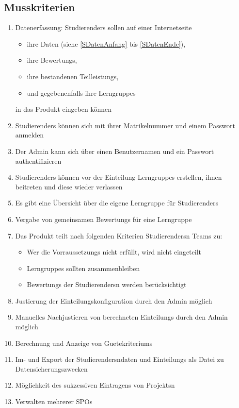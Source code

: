\documentclass[parskip=full]{scrartcl}
\newcommand{\swtLabel}[1]{\textbf{/#1\arabic*0/}}
\begin{document}
\subsection{Musskriterien}
 \begin{enumerate}[label=\swtLabel{M}]
   \item Datenerfassung: \glspl{Studierender} sollen auf einer Internetseite  
   \begin{itemize}
     \item ihre Daten (siehe \ref{SDatenAnfang} bis \ref{SDatenEnde}),     
     \item ihre \glspl{Bewertung}, 
     \item ihre bestandenen \glspl{Teilleistung},
     \item und gegebenenfalls ihre \glspl{Lerngruppe}
   \end{itemize}
   in das Produkt eingeben können
   \item \glspl{Studierender} können sich mit ihrer \gls{Matrikelnummer} und einem Passwort anmelden
   \item Der \gls{Admin} kann sich über einen \gls{Benutzername}n und ein Passwort authentifizieren
   \item \glspl{Studierender} können vor der \gls{Einteilung} \glspl{Lerngruppe} erstellen, ihnen beitreten und diese wieder verlassen
    \item Es gibt eine Übersicht über die eigene \gls{Lerngruppe} für
    \glspl{Studierender}
    \item Vergabe von gemeinsamen  \glspl{Bewertung} für eine \gls{Lerngruppe}
   \item Das Produkt teilt nach folgenden Kriterien \glspl{Studierender}n \glspl{Team} zu:
   \label{Mzuteilung}
   \begin{itemize}
     \item Wer die \glspl{Vorraussetzung} nicht erfüllt, wird nicht eingeteilt
     \item \glspl{Lerngruppe} sollten zusammenbleiben
     \item \glspl{Bewertung} der \glspl{Studierender}n werden berücksichtigt
   \end{itemize}
     \item Justierung der \gls{Einteilungskonfiguration} durch den \gls{Admin} möglich
   \item Manuelles Nachjustieren von berechneten \glspl{Einteilung} durch den \gls{Admin} möglich
   \item Berechnung und Anzeige von \glspl{Guetekriterium}
   \item Im- und Export der \glspl{Studierender}ndaten und
   \glspl{Einteilung} als Datei zu Datensicherungszwecken
   \item Möglichkeit des sukzessiven Eintragens von \glspl{Projekt}n
   \item Verwalten mehrerer \glspl{SPO}
  
 \end{enumerate}
\end{document}
